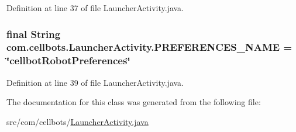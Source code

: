 Definition at line 37 of file Launcher\-Activity.\-java.

\hypertarget{classcom_1_1cellbots_1_1_launcher_activity_ad9c3f9c3530aca1b56f4045c87ee92e3}{
\subsubsection[{P\-R\-E\-F\-E\-R\-E\-N\-C\-E\-S\-\_\-\-N\-A\-M\-E}]{\setlength{\rightskip}{0pt plus 5cm}final String {\bf com.\-cellbots.\-Launcher\-Activity.\-P\-R\-E\-F\-E\-R\-E\-N\-C\-E\-S\-\_\-\-N\-A\-M\-E} = \char`\"{}cellbot\-Robot\-Preferences\char`\"{}}}\label{classcom_1_1cellbots_1_1_launcher_activity_ad9c3f9c3530aca1b56f4045c87ee92e3}


Definition at line 39 of file Launcher\-Activity.\-java.



The documentation for this class was generated from the following file\-:\begin{DoxyCompactItemize}
\item 
src/com/cellbots/\hyperlink{_launcher_activity_8java}{Launcher\-Activity.\-java}\end{DoxyCompactItemize}
